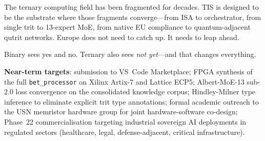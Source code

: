 \documentclass[journal,10pt,twocolumn]{IEEEtran}
\begin{document}
The ternary computing field has been fragmented for decades. TIS is designed
to be the substrate where those fragments converge---from ISA to orchestrator,
from single trit to 13-expert MoE, from native EU compliance to quantum-adjacent
qutrit networks. Europe does not need to catch up. It needs to leap ahead.

Binary sees yes and no. Ternary also sees \emph{not yet}---and that changes
everything.

\vspace{1em}
\noindent\textbf{Near-term targets}: submission to VS~Code Marketplace; FPGA
synthesis of the full \texttt{bet\_processor} on Xilinx Artix-7 and Lattice
ECP5; Albert-MoE-13 sub-2.0 loss convergence on the consolidated knowledge
corpus; Hindley-Milner type inference to eliminate explicit trit type
annotations; formal academic outreach to the USN memristor hardware group for
joint hardware-software co-design; Phase~22 commercialisation targeting
industrial sovereign AI deployments in regulated sectors (healthcare, legal,
defense-adjacent, critical infrastructure).



\end{document}

